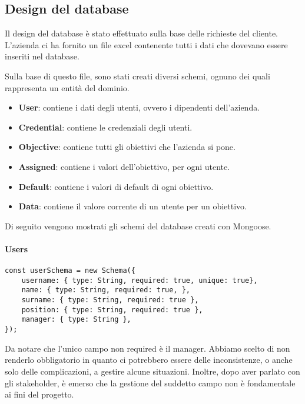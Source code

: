 
\subsection{Design del database}

Il design del database è stato effettuato sulla base delle richieste del cliente.
L'azienda ci ha fornito un file excel contenente tutti i dati che dovevano essere inseriti nel database.

Sulla base di questo file, sono stati creati diversi schemi, ognuno dei quali rappresenta un entità del dominio.

\begin{itemize}
    \item \textbf{User}: contiene i dati degli utenti, ovvero i dipendenti dell'azienda.
    \item \textbf{Credential}: contiene le credenziali degli utenti.
    \item \textbf{Objective}: contiene tutti gli obiettivi che l'azienda si pone.
    \item \textbf{Assigned}: contiene i valori dell'obiettivo, per ogni utente.
    \item \textbf{Default}: contiene i valori di default di ogni obiettivo.
    \item \textbf{Data}: contiene il valore corrente di un utente per un obiettivo.
\end{itemize}

Di seguito vengono mostrati gli schemi del database creati con Mongoose.

\paragraph{Users}

\begin{verbatim}
const userSchema = new Schema({
    username: { type: String, required: true, unique: true},
    name: { type: String, required: true, },
    surname: { type: String, required: true },
    position: { type: String, required: true },
    manager: { type: String },
});
\end{verbatim}

Da notare che l'unico campo non required è il manager. Abbiamo scelto di non renderlo obbligatorio in quanto
ci potrebbero essere delle inconsistenze, o anche solo delle complicazioni, a gestire alcune situazioni.
Inoltre, dopo aver parlato con gli stakeholder, è emerso che la gestione del suddetto campo non è fondamentale 
ai fini del progetto.

